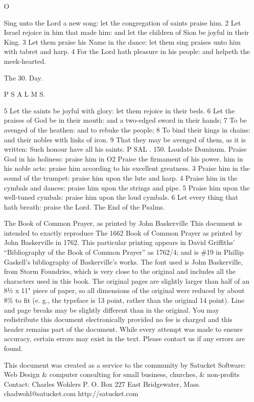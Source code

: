 O

Sing unto the Lord a new song: let the congregation of saints praise him. 2 Let Israel rejoice in him that made him: and let the children of Sion be joyful in their King. 3 Let them praise his Name in the dance: let them sing praises unto him with tabret and harp. 4 For the Lord hath pleasure in his people: and helpeth the meek-hearted.

The 30. Day.

P S A L M S.

5 Let the saints be joyful with glory: let them rejoice in their beds. 6 Let the praises of God be in their mouth: and a two-edged sword in their hands; 7 To be avenged of the heathen: and to rebuke the people; 8 To bind their kings in chains: and their nobles with links of iron. 9 That they may be avenged of them, as it is written: Such honour have all his saints. P SAL . 150. Laudate Dominum. Praise God in his holiness: praise him in O2 Praise the firmament of his power. him in his noble acts: praise him according to his excellent greatness. 3 Praise him in the sound of the trumpet: praise him upon the lute and harp. 4 Praise him in the cymbals and dances: praise him upon the strings and pipe. 5 Praise him upon the well-tuned cymbals: praise him upon the loud cymbals. 6 Let every thing that hath breath: praise the Lord. The End of the Psalms.


The Book of Common Prayer, as printed by John Baskerville This document is intended to exactly reproduce The 1662 Book of Common Prayer as printed by John Baskerville in 1762. This particular printing appears in David Griffiths' “Bibliography of the Book of Common Prayer” as 1762/4; and is \#19 in Phillip Gaskell's bibliography of Baskerville's works. The font used is John Baskerville, from Storm Foundries, which is very close to the original and includes all the characters used in this book. The original pages are slightly larger than half of an 8½ x 11" piece of paper, so all dimensions of the original were reduced by about 8\% to fit (e. g., the typeface is 13 point, rather than the original 14 point). Line and page breaks may be slightly different than in the original. You may redistribute this document electronically provided no fee is charged and this header remains part of the document. While every attempt was made to ensure accuracy, certain errors may exist in the text. Please contact us if any errors are found.

This document was created as a service to the community by Satucket Software: Web Design \& computer consulting for small business, churches, \& non-profits Contact: Charles Wohlers P. O. Box 227 East Bridgewater, Mass. chadwohl@satucket.com http://satucket.com

